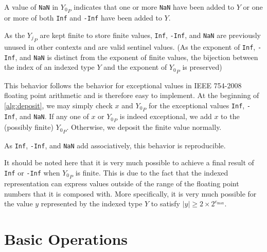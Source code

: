 \documentclass[12pt]{article}
\providecommand{\max}{\ensuremath{\text{max}}}
\theoremstyle{plain}
\numberwithin{equation}{section}
\begin{document}
      A value of \verb|NaN| in ${Y_0}_P$ indicates that one or more \verb|NaN| have been added to $Y$ or one or more of both \verb|Inf| and \verb|-Inf| have been added to $Y$.

      As the ${Y_j}_P$ are kept finite to store finite values, \verb|Inf|, \verb|-Inf|, and \verb|NaN| are previously unused in other contexts and are valid sentinel values. (As the exponent of \verb|Inf|, \verb|-Inf|, and \verb|NaN| is distinct from the exponent of finite values, the bijection between the index of an indexed type $Y$ and the exponent of ${Y_0}_P$ is preserved)

      This behavior follows the behavior for exceptional values in IEEE 754-2008 floating point arithmetic and is therefore easy to implement. At the beginning of \ref{alg:deposit}, we may simply check $x$ and ${Y_0}_P$ for the exceptional values \verb|Inf|, \verb|-Inf|, and \verb|NaN|. If any one of $x$ or ${Y_0}_P$ is indeed exceptional, we add $x$ to the (possibly finite) ${Y_0}_P$. Otherwise, we deposit the finite value normally.

      As \verb|Inf|, \verb|-Inf|, and \verb|NaN| add associatively, this behavior is reproducible.

      It should be noted here that it is very much possible to achieve a final result of \verb|Inf| or \verb|-Inf| when ${Y_0}_P$ is finite. This is due to the fact that the indexed representation can express values outside of the range of the floating point numbers that it is composed with. More specifically, it is very much possible for the value $y$ represented by the indexed type $Y$ to satisfy $|y| \geq 2 \times 2^{e_{\max}}$.

\section{Basic Operations}
\end{document}
